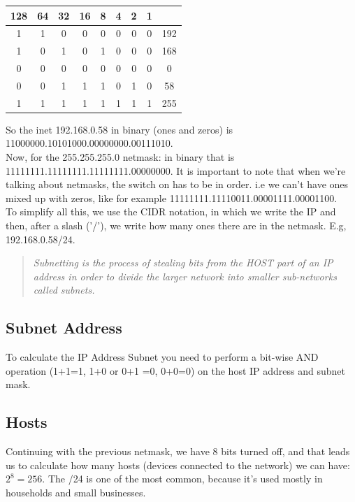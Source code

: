 \documentclass[11pt,a4paper]{article}
\begin{document}
\begin{table}[h]
\centering
\begin{tabular}{|c|c|c|c|c|c|c|c||c|}
\hline 
\textbf{128} & \textbf{64} & \textbf{32} & \textbf{16} & \textbf{8} & \textbf{4} & \textbf{2} & \textbf{1} &  \\ 
\hline 
1 & 1 & 0 & 0 & 0 & 0 & 0 & 0 & 192 \\
\hline
1&0&1&0&1&0&0&0&168\\
\hline 
0 & 0 & 0 & 0 & 0 & 0 & 0 & 0 & 0 \\ 
\hline
0&0&1&1&1&0&1&0&58\\
\hline 
1 & 1 & 1 & 1 & 1 & 1 & 1 & 1 & 255 \\
\hline 
\end{tabular} 
\end{table}
So the inet 192.168.0.58 in binary (ones and zeros) is 11000000.10101000.00000000.00111010.\\

Now, for the 255.255.255.0 netmask: in binary that is 11111111.11111111.11111111.00000000. It is important to note that when we're talking about netmasks, the switch on has to be in order. i.e we can't have ones mixed up with zeros, like for example 11111111.11110011.00001111.00001100.\\

To simplify all this, we use the CIDR notation, in which we write the IP and then, after a slash ('/'), we write how many ones there are in the netmask. E.g, 192.168.0.58/24.\\ 

\begin{quote} \textit{Subnetting is the process of stealing bits from the HOST part of an IP address in order to divide the larger network into smaller sub-networks called subnets.} \end{quote}

\subsection{Subnet Address}
To calculate the IP Address Subnet you need to perform a bit-wise AND operation (1+1=1, 1+0 or 0+1 =0, 0+0=0) on the host IP address and subnet mask.

\subsection{Hosts}
Continuing with the previous netmask, we have 8 bits turned off, and that leads us to calculate how many hosts (devices connected to the network) we can have: $2^8 = 256$. The /24 is one of the most common, because it's used mostly in households and small businesses.
\end{document}
